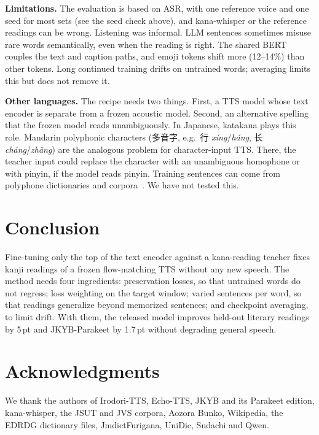 \documentclass[10pt,a4paper,twocolumn]{article}
\newcommand{\pt}{\,pt}
\begin{document}
\textbf{Limitations.} The evaluation is based on ASR, with one reference voice and one seed
for most sets (see the seed check above), and kana-whisper or the reference readings can be wrong. Listening
was informal. LLM sentences sometimes misuse rare words semantically, even when the reading is
right. The shared BERT couples the text and caption paths, and emoji tokens shift more
(12--14\%) than other tokens. Long continued training drifts on untrained words; averaging
limits this but does not remove it.

\textbf{Other languages.} The recipe needs two things. First, a TTS model whose text encoder
is separate from a frozen acoustic model. Second, an alternative spelling that the frozen model
reads unambiguously. In Japanese, katakana plays this role. Mandarin polyphonic characters
(多音字, e.g.\ 行 \emph{xíng}/\emph{háng}, 长 \emph{cháng}/\emph{zhǎng}) are the analogous
problem for character-input TTS. There, the teacher input could replace the character with an
unambiguous homophone or with pinyin, if the model reads pinyin. Training sentences can come from
polyphone dictionaries and corpora~\cite{g2pm}. We have not tested this.

\section{Conclusion}
Fine-tuning only the top of the text encoder against a kana-reading teacher fixes kanji readings
of a frozen flow-matching TTS without any new speech. The method needs four ingredients:
preservation losses, so that untrained words do not regress; loss weighting on the target
window; varied sentences per word, so that readings generalize beyond memorized sentences; and
checkpoint averaging, to limit drift. With them, the released model improves held-out literary
readings by 5\pt{} and JKYB-Parakeet by 1.7\pt{} without degrading general speech.

\section*{Acknowledgments}
We thank the authors of Irodori-TTS, Echo-TTS, JKYB and its Parakeet edition, kana-whisper,
the JSUT and JVS corpora, Aozora Bunko, Wikipedia, the EDRDG dictionary files, JmdictFurigana,
UniDic, Sudachi and Qwen.
\end{document}
